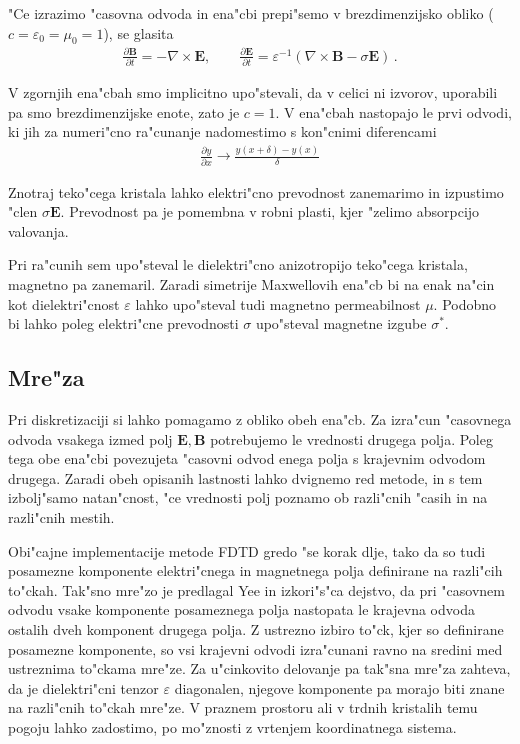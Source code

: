 \documentclass[a4paper,10pt]{article}
\newcommand{\odvod}[2]{\frac{\partial #1}{\partial #2}}
\renewcommand{\vec}{\mathbf}
\newcommand{\eps}{\varepsilon}
\begin{document}
"Ce izrazimo "casovna odvoda in ena"cbi prepi"semo v brezdimenzijsko obliko ($c = \varepsilon_0 = \mu_0 = 1$), se glasita
\begin{align}
\label{eq:maxwell-base}
 \odvod{\vec{B}}{t} = -\nabla \times \vec{E}, \qquad \odvod{\vec{E}}{t} = \eps^{-1} (\nabla \times \vec{B} - \sigma \vec E)\,.
\end{align}

V zgornjih ena"cbah smo implicitno upo"stevali, da v celici ni izvorov, uporabili pa smo brezdimenzijske enote, zato je $c=1$.
V ena"cbah nastopajo le prvi odvodi, ki jih za numeri"cno ra"cunanje nadomestimo s kon"cnimi diferencami
\begin{align}
 \frac{\partial y}{\partial x} \rightarrow \frac{y(x+\delta) - y(x)}{\delta}
\end{align}

Znotraj teko"cega kristala lahko elektri"cno prevodnost zanemarimo in izpustimo "clen $\sigma \vec E$. 
Prevodnost pa je pomembna v robni plasti, kjer "zelimo absorpcijo valovanja. 

Pri ra"cunih sem upo"steval le dielektri"cno anizotropijo teko"cega kristala, magnetno pa zanemaril. 
Zaradi simetrije Maxwellovih ena"cb bi na enak na"cin kot dielektri"cnost $\varepsilon$ lahko upo"steval tudi magnetno permeabilnost $\mu$. 
Podobno bi lahko poleg elektri"cne prevodnosti $\sigma$ upo"steval magnetne izgube $\sigma^*$. 

\subsection{Mre"za}

Pri diskretizaciji si lahko pomagamo z obliko obeh ena"cb. 
Za izra"cun "casovnega odvoda vsakega izmed polj $\vec{E}, \vec{B}$ potrebujemo le vrednosti drugega polja. 
Poleg tega obe ena"cbi povezujeta "casovni odvod enega polja s krajevnim odvodom drugega. 
Zaradi obeh opisanih lastnosti lahko dvignemo red metode, in s tem izbolj"samo natan"cnost, "ce vrednosti polj poznamo ob razli"cnih "casih in na razli"cnih mestih\cite{taflove}. 

Obi"cajne implementacije metode \acs{FDTD} gredo "se korak dlje, tako da so tudi posamezne komponente elektri"cnega in magnetnega polja definirane na razli"cih to"ckah\cite{yee, yee-lattice}.
Tak"sno mre"zo je predlagal Yee in izkori"s"ca dejstvo, da pri "casovnem odvodu vsake komponente posameznega polja nastopata le krajevna odvoda ostalih dveh komponent drugega polja. 
Z ustrezno izbiro to"ck, kjer so definirane posamezne komponente, so vsi krajevni odvodi izra"cunani ravno na sredini med ustreznima to"ckama mre"ze. 
Za u"cinkovito delovanje pa tak"sna mre"za zahteva, da je dielektri"cni tenzor $\eps$ diagonalen, njegove komponente pa morajo biti znane na razli"cnih to"ckah mre"ze. 
V praznem prostoru ali v trdnih kristalih temu pogoju lahko zadostimo, po mo"znosti z vrtenjem koordinatnega sistema.
\end{document}
